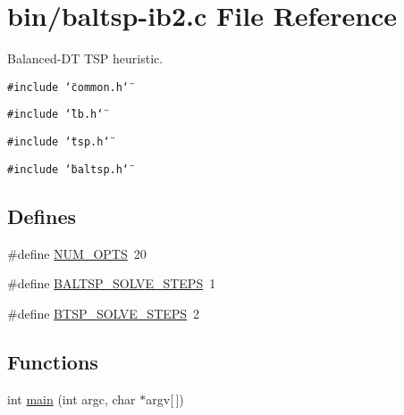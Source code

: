 \hypertarget{bin_2baltsp-ib2_8c}{
\section{bin/baltsp-ib2.c File Reference}
\label{bin_2baltsp-ib2_8c}
}
Balanced-DT TSP heuristic.  


{\tt \#include \char`\"{}common.h\char`\"{}}\par
{\tt \#include \char`\"{}lb.h\char`\"{}}\par
{\tt \#include \char`\"{}tsp.h\char`\"{}}\par
{\tt \#include \char`\"{}baltsp.h\char`\"{}}\par
\subsection*{Defines}
\begin{CompactItemize}
\item 
\#define \hyperlink{bin_2baltsp-ib2_8c_9b58b2c4af931c8486a986c9deca40f5}{NUM\_\-OPTS}~20
\item 
\#define \hyperlink{bin_2baltsp-ib2_8c_d9b2b3cc92b48bea976b603f970e8e41}{BALTSP\_\-SOLVE\_\-STEPS}~1
\item 
\#define \hyperlink{bin_2baltsp-ib2_8c_83255427b2f2f52d715e7b88d97ce089}{BTSP\_\-SOLVE\_\-STEPS}~2
\end{CompactItemize}
\subsection*{Functions}
\begin{CompactItemize}
\item 
int \hyperlink{bin_2baltsp-ib2_8c_0ddf1224851353fc92bfbff6f499fa97}{main} (int argc, char $\ast$argv\mbox{[}$\,$\mbox{]})
\end{CompactItemize}
